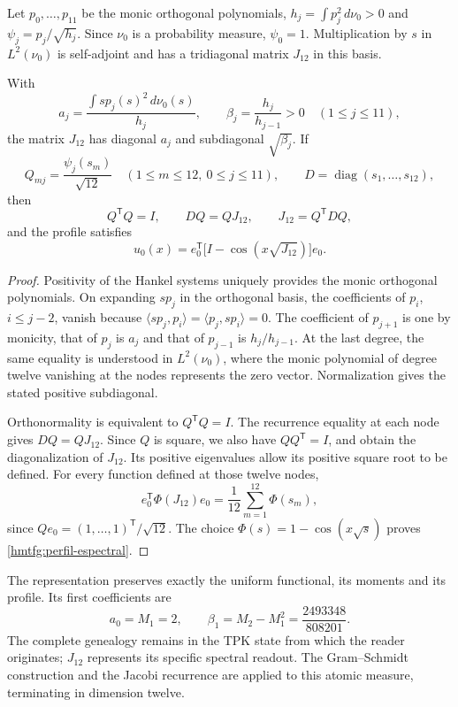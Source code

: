 Let \(p_0,\ldots,p_{11}\) be the monic orthogonal polynomials,
\(h_j=\int p_j^2\,d\nu_0>0\) and
\(\psi_j=p_j/\sqrt{h_j}\). Since \(\nu_0\) is a probability measure,
\(\psi_0=1\). Multiplication by \(s\) in \(L^2(\nu_0)\) is self-adjoint and has a tridiagonal matrix \(J_{12}\) in this basis.

\begin{proposition}
\label{hmtfg:jacobi-entrelazamiento}
With
\[
 a_j=\frac{\int s p_j(s)^2\,d\nu_0(s)}{h_j},\qquad
 \beta_j=\frac{h_j}{h_{j-1}}>0\quad(1\le j\le11),
\]
the matrix \(J_{12}\) has diagonal \(a_j\) and subdiagonal
\(\sqrt{\beta_j}\). If
\[
 Q_{mj}=\frac{\psi_j(s_m)}{\sqrt{12}}
 \quad(1\le m\le12,\ 0\le j\le11),\qquad
 D=\operatorname{diag}(s_1,\ldots,s_{12}),
\]
then
\[
 Q^{\mathsf T}Q=I,\qquad DQ=QJ_{12},\qquad
 J_{12}=Q^{\mathsf T}DQ,
\]
and the profile satisfies
\begin{equation}
 u_0(x)=e_0^{\mathsf T}
          \bigl[I-\cos(x\sqrt{J_{12}})\bigr]e_0.
 \label{hmtfg:perfil-espectral}
\end{equation}
\end{proposition}
\begin{proof}
Positivity of the Hankel systems uniquely provides the monic orthogonal polynomials. On expanding \(s p_j\) in the orthogonal basis, the coefficients of \(p_i\), \(i\le j-2\), vanish because
\(\langle sp_j,p_i\rangle=\langle p_j,sp_i\rangle=0\).
The coefficient of \(p_{j+1}\) is one by monicity, that of \(p_j\) is \(a_j\) and that of \(p_{j-1}\) is \(h_j/h_{j-1}\). At the last degree, the same equality is understood in \(L^2(\nu_0)\), where the monic polynomial of degree twelve vanishing at the nodes represents the zero vector. Normalization gives the stated positive subdiagonal.

Orthonormality is equivalent to \(Q^{\mathsf T}Q=I\). The recurrence equality at each node gives \(DQ=QJ_{12}\). Since \(Q\) is square, we also have \(QQ^{\mathsf T}=I\), and obtain the diagonalization of \(J_{12}\). Its positive eigenvalues allow its positive square root to be defined. For every function defined at those twelve nodes,
\[
 e_0^{\mathsf T}\Phi(J_{12})e_0
   =\frac1{12}\sum_{m=1}^{12}\Phi(s_m),
\]
since \(Qe_0=(1,\ldots,1)^{\mathsf T}/\sqrt{12}\).
The choice \(\Phi(s)=1-\cos(x\sqrt{s})\) proves
\eqref{hmtfg:perfil-espectral}.
\end{proof}

The representation preserves exactly the uniform functional, its moments and its profile. Its first coefficients are
\[
 a_0=M_1=2,\qquad
 \beta_1=M_2-M_1^2=\frac{2493348}{808201}.
\]
The complete genealogy remains in the TPK state from which the reader originates; \(J_{12}\) represents its specific spectral readout. The Gram--Schmidt construction and the Jacobi recurrence are applied to this atomic measure, terminating in dimension twelve.

